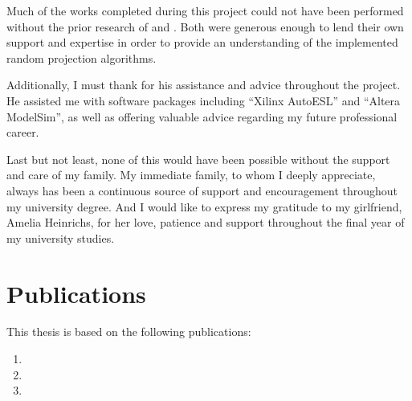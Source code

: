 \documentclass[a4paper]{report}
\begin{document}
Much of the works completed during this project could not have been performed
without the prior research of  and . Both were
generous enough to lend their own support and expertise in order to provide an
understanding of the implemented random projection algorithms.

Additionally, I must thank  for his assistance and advice
throughout the project. He assisted me with software packages including ``Xilinx
AutoESL'' and ``Altera ModelSim'', as well as offering valuable advice regarding
my future professional career.

Last but not least, none of this would have been possible without the support
and care of my family. My immediate family, to whom I deeply appreciate, always
has been a continuous source of support and encouragement throughout my
university degree. And I would like to express my gratitude to my girlfriend,
Amelia Heinrichs, for her love, patience and support throughout the final year
of my university studies.

\chapter*{Publications}
This thesis is based on the following publications:
\begin{enumerate}
\item {}
\item {}
\item {}
\end{enumerate}
\end{document}
